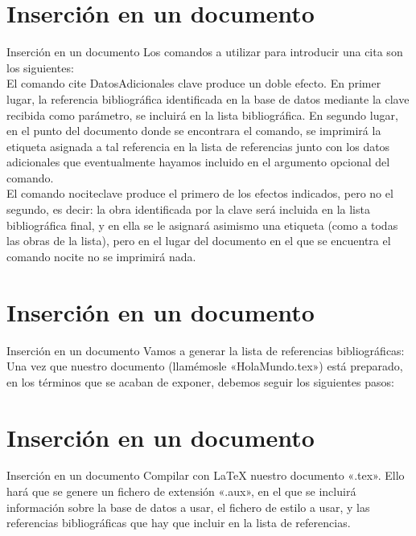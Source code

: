\documentclass[9pt]{beamer}
\begin{document}
\section{Inserción en un documento}
\begin{frame}{Inserción en un documento}
Los comandos a utilizar para introducir una cita son los siguientes:\\
    El comando cite DatosAdicionales  clave  produce un doble efecto. En primer lugar, la referencia bibliográfica identificada en la base de datos mediante la clave recibida como parámetro, se incluirá en la lista bibliográfica. En segundo lugar, en el punto del documento donde se encontrara el comando, se imprimirá la etiqueta asignada a tal referencia en la lista de referencias junto con los datos adicionales que eventualmente hayamos incluido en el argumento opcional del comando.\\
    El comando nocite{clave} produce el primero de los efectos indicados, pero no el segundo, es decir: la obra identificada por la clave será incluida en la lista bibliográfica final, y en ella se le asignará asimismo una etiqueta (como a todas las obras de la lista), pero en el lugar del documento en el que se encuentra el comando nocite no se imprimirá nada.\\

\end{frame}

\section{Inserción en un documento}
\begin{frame}{Inserción en un documento}
Vamos a generar la lista de referencias bibliográficas:\\
Una vez que nuestro documento (llamémosle «HolaMundo.tex») está preparado, en los términos que se acaban de exponer, debemos seguir los siguientes pasos:\\
 

\end{frame}

\section{Inserción en un documento}
\begin{frame}{Inserción en un documento}
Compilar con LaTeX nuestro documento «.tex». Ello hará que se genere un fichero de extensión «.aux», en el que se incluirá información sobre la base de datos a usar, el fichero de estilo a usar, y las referencias bibliográficas que hay que incluir en la lista de referencias.\\
\end{frame}
\end{document}
